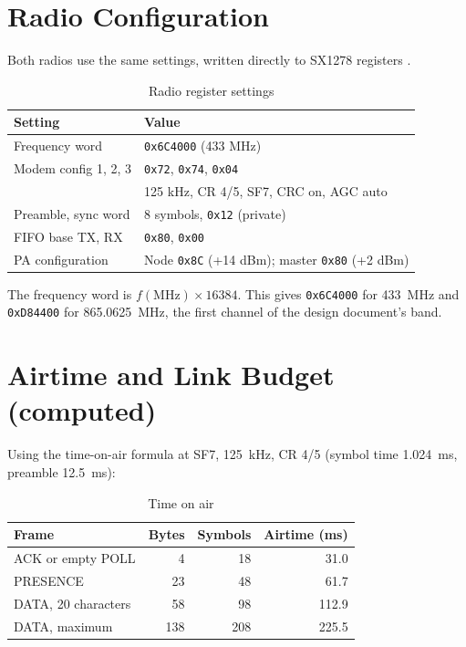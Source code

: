 \documentclass{tietreport}
\begin{document}
\section{Radio Configuration}

Both radios use the same settings, written directly to SX1278
registers \cite{sx1278datasheet}.

\begin{table}[h]
\centering
\small
\begin{tabular}{|l|l|}
  \hline
  \textbf{Setting} & \textbf{Value} \\
  \hline
  Frequency word & \texttt{0x6C4000} (433 MHz) \\
  \hline
  Modem config 1, 2, 3 & \texttt{0x72}, \texttt{0x74}, \texttt{0x04} \\
  & 125 kHz, CR 4/5, SF7, CRC on, AGC auto \\
  \hline
  Preamble, sync word & 8 symbols, \texttt{0x12} (private) \\
  \hline
  FIFO base TX, RX & \texttt{0x80}, \texttt{0x00} \\
  \hline
  PA configuration & Node \texttt{0x8C} (+14 dBm); master \texttt{0x80} (+2 dBm) \\
  \hline
\end{tabular}
\caption{Radio register settings}
\end{table}

The frequency word is $f(\mathrm{MHz}) \times 16384$. This gives
\texttt{0x6C4000} for 433~MHz and \texttt{0xD84400} for 865.0625~MHz,
the first channel of the design document's band.

\section{Airtime and Link Budget (computed)}

Using the time-on-air formula at SF7, 125~kHz, CR 4/5 (symbol time
1.024~ms, preamble 12.5~ms):

\begin{table}[h]
\centering
\small
\begin{tabular}{|l|r|r|r|}
  \hline
  \textbf{Frame} & \textbf{Bytes} & \textbf{Symbols} &
  \textbf{Airtime (ms)} \\
  \hline
  ACK or empty POLL & 4 & 18 & 31.0 \\
  \hline
  PRESENCE & 23 & 48 & 61.7 \\
  \hline
  DATA, 20 characters & 58 & 98 & 112.9 \\
  \hline
  DATA, maximum & 138 & 208 & 225.5 \\
  \hline
\end{tabular}
\caption{Time on air}
\end{table}
\end{document}
